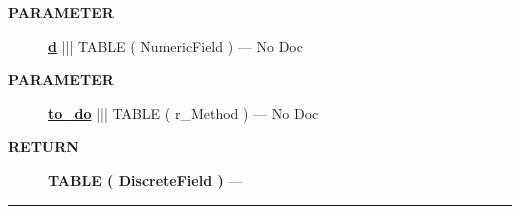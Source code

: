 \par
\begin{description}
\item [\colorbox{tagtype}{\color{white} \textbf{\textsf{PARAMETER}}}] \textbf{\underline{d}} ||| TABLE ( NumericField ) --- No Doc
\item [\colorbox{tagtype}{\color{white} \textbf{\textsf{PARAMETER}}}] \textbf{\underline{to\_do}} ||| TABLE ( r\_Method ) --- No Doc
\end{description}







\par
\begin{description}
\item [\colorbox{tagtype}{\color{white} \textbf{\textsf{RETURN}}}] \textbf{TABLE ( DiscreteField )} --- 
\end{description}




\rule{\linewidth}{0.5pt}


